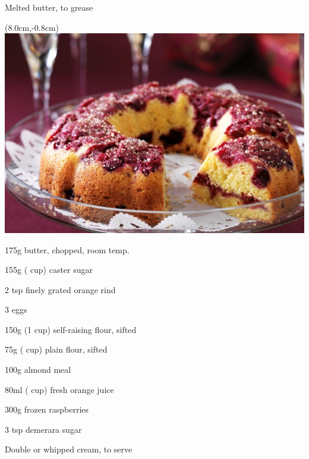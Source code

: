 \begin{ingredients-list}
	\item Melted butter, to grease
		\begin{textblock*}{8cm}(8.0cm,-0.8cm) %
			\includegraphics[scale=0.38]{./img/raspberry_orange.jpg}
		\end{textblock*}
	\item 175g butter, chopped, room temp.
	\item 155g ( cup) caster sugar
	\item 2 tsp finely grated orange rind
	\item 3 eggs
	\item 150g (1 cup) self-raising flour, sifted
	\item 75g ( cup) plain flour, sifted
	\item 100g almond meal
	\item 80ml ( cup) fresh orange juice
	\item 300g frozen raspberries
	\item 3 tsp demerara sugar
	\item Double or whipped cream, to serve 
\end{ingredients-list}

